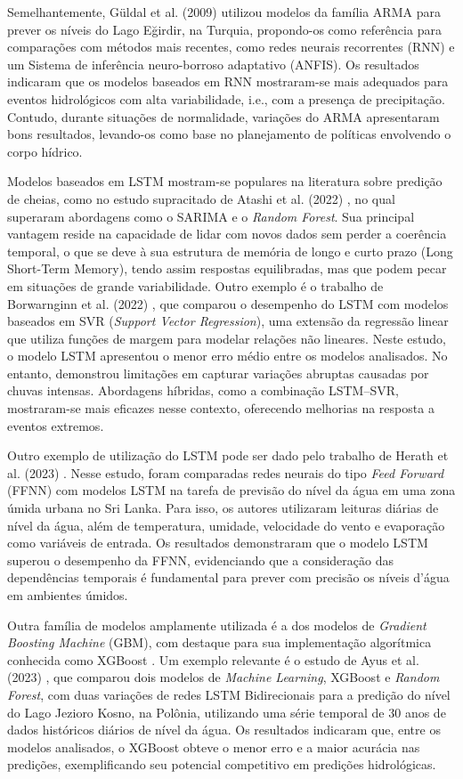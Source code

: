 Semelhantemente, Güldal et al. (2009) \cite{gudal} utilizou modelos da família ARMA para prever os níveis do Lago
Eğirdir, na Turquia, propondo-os como referência para comparações com métodos mais recentes, como redes neurais
recorrentes (RNN) e um Sistema de inferência neuro-borroso adaptativo (ANFIS). Os resultados indicaram que os modelos
baseados em RNN mostraram-se mais adequados para eventos hidrológicos com alta variabilidade, i.e., com a presença de
precipitação. Contudo, durante situações de normalidade, variações do ARMA apresentaram bons resultados, levando-os como
base no planejamento de políticas envolvendo o corpo hídrico. 

Modelos baseados em LSTM \cite{hochreiter} mostram-se populares na literatura sobre predição de cheias, como no estudo
supracitado de Atashi et al. (2022) \cite{atashi}, no qual superaram abordagens como o SARIMA e o \textit{Random
Forest}. Sua principal vantagem reside na capacidade de lidar com novos dados sem perder a coerência temporal, o que se
deve à sua estrutura de memória de longo e curto prazo (Long Short-Term Memory), tendo assim respostas equilibradas, mas
que podem pecar em situações de grande variabilidade. Outro exemplo é o trabalho de Borwarnginn et al. (2022)
\cite{borwarnginn}, que comparou o desempenho do LSTM com modelos baseados em SVR (\textit{Support Vector Regression}),
uma extensão da regressão linear que utiliza funções de margem para modelar relações não lineares. Neste estudo, o
modelo LSTM apresentou o menor erro médio entre os modelos analisados. No entanto, demonstrou limitações em capturar
variações abruptas causadas por chuvas intensas. Abordagens híbridas, como a combinação LSTM–SVR, mostraram-se mais
eficazes nesse contexto, oferecendo melhorias na resposta a eventos extremos.

Outro exemplo de utilização do LSTM pode ser dado pelo trabalho de Herath et al. (2023) \cite{herath}. Nesse estudo,
foram comparadas redes neurais do tipo \textit{Feed Forward} (FFNN) com modelos LSTM na tarefa de previsão do nível da
água em uma zona úmida urbana no Sri Lanka. Para isso, os autores utilizaram leituras diárias de nível da água, além de
temperatura, umidade, velocidade do vento e evaporação como variáveis de entrada. Os resultados demonstraram que o
modelo LSTM superou o desempenho da FFNN, evidenciando que a consideração das dependências temporais é fundamental para
prever com precisão os níveis d’água em ambientes úmidos.

Outra família de modelos amplamente utilizada é a dos modelos de \textit{Gradient Boosting Machine} (GBM), com destaque
para sua implementação algorítmica conhecida como XGBoost \cite{chen_xgboost}. Um exemplo relevante é o estudo de Ayus
et al. (2023) \cite{ayus}, que comparou dois modelos de \textit{Machine Learning}, XGBoost e \textit{Random Forest}, com
duas variações de redes LSTM Bidirecionais para a predição do nível do Lago Jezioro Kosno, na Polônia, utilizando uma
série temporal de 30 anos de dados históricos diários de nível da água. Os resultados indicaram que, entre os modelos
analisados, o XGBoost obteve o menor erro e a maior acurácia nas predições, exemplificando seu potencial competitivo em
predições hidrológicas.

